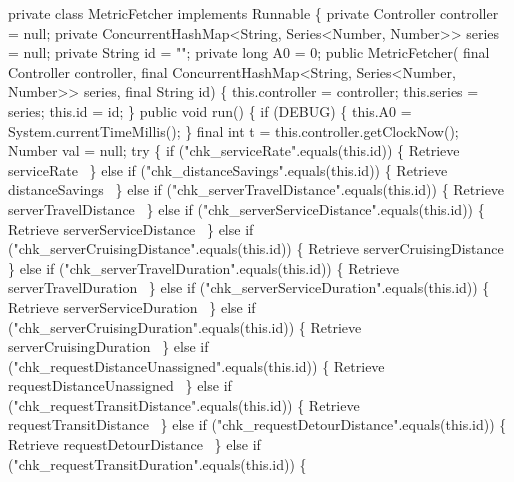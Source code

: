 \nwenddocs{}\plusendmoddef
private class MetricFetcher implements Runnable \{
  private Controller controller = null;
  private ConcurrentHashMap<String, Series<Number, Number>> series = null;
  private String id = "";
  private long A0 = 0;
  public MetricFetcher(
      final Controller controller,
      final ConcurrentHashMap<String, Series<Number, Number>> series,
      final String id) \{
    this.controller = controller;
    this.series = series;
    this.id = id;
  \}
  public void run() \{
    if (DEBUG) \{
      this.A0 = System.currentTimeMillis();
    \}
    final int t = this.controller.getClockNow();
    Number val = null;
    try \{
      if ("chk_serviceRate".equals(this.id)) \{
        \LA{}Retrieve serviceRate~{\nwtagstyle{}}\RA{}
      \} else if ("chk_distanceSavings".equals(this.id)) \{
        \LA{}Retrieve distanceSavings~{\nwtagstyle{}}\RA{}
      \} else if ("chk_serverTravelDistance".equals(this.id)) \{
        \LA{}Retrieve serverTravelDistance~{\nwtagstyle{}}\RA{}
      \} else if ("chk_serverServiceDistance".equals(this.id)) \{
        \LA{}Retrieve serverServiceDistance~{\nwtagstyle{}}\RA{}
      \} else if ("chk_serverCruisingDistance".equals(this.id)) \{
        \LA{}Retrieve serverCruisingDistance~{\nwtagstyle{}}\RA{}
      \} else if ("chk_serverTravelDuration".equals(this.id)) \{
        \LA{}Retrieve serverTravelDuration~{\nwtagstyle{}}\RA{}
      \} else if ("chk_serverServiceDuration".equals(this.id)) \{
        \LA{}Retrieve serverServiceDuration~{\nwtagstyle{}}\RA{}
      \} else if ("chk_serverCruisingDuration".equals(this.id)) \{
        \LA{}Retrieve serverCruisingDuration~{\nwtagstyle{}}\RA{}
      \} else if ("chk_requestDistanceUnassigned".equals(this.id)) \{
        \LA{}Retrieve requestDistanceUnassigned~{\nwtagstyle{}}\RA{}
      \} else if ("chk_requestTransitDistance".equals(this.id)) \{
        \LA{}Retrieve requestTransitDistance~{\nwtagstyle{}}\RA{}
      \} else if ("chk_requestDetourDistance".equals(this.id)) \{
        \LA{}Retrieve requestDetourDistance~{\nwtagstyle{}}\RA{}
      \} else if ("chk_requestTransitDuration".equals(this.id)) \{
